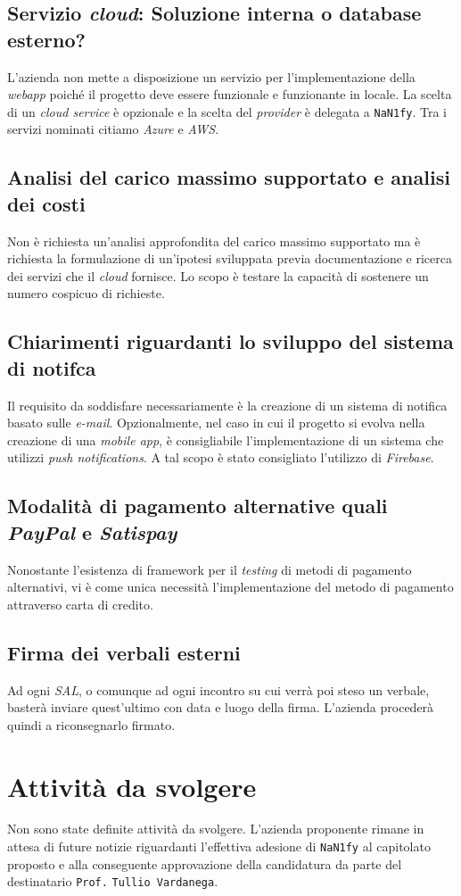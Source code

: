 \subsection{Servizio \textit{cloud}: Soluzione interna o database esterno?}
    L'azienda non mette a disposizione un servizio per l'implementazione della \textit{webapp} poiché il progetto deve essere funzionale e funzionante in locale. La scelta di un \textit{cloud service} è opzionale e la scelta del \textit{provider} è delegata a \texttt{NaN1fy}. Tra i servizi nominati citiamo \textit{Azure} e \textit{AWS}.
\subsection{Analisi del carico massimo supportato e analisi dei costi}
    Non è richiesta un'analisi approfondita del carico massimo supportato ma è richiesta la formulazione di un'ipotesi sviluppata previa documentazione e ricerca dei servizi che il \textit{cloud} fornisce.
    Lo scopo è testare la capacità di sostenere un numero cospicuo di richieste.
\subsection{Chiarimenti riguardanti lo sviluppo del sistema di notifca}
    Il requisito da soddisfare necessariamente è la creazione di un sistema di notifica basato sulle \textit{e-mail}. Opzionalmente, nel caso in cui il progetto si evolva nella creazione di una \textit{mobile app}, è consigliabile l'implementazione di un sistema che utilizzi \textit{push notifications}. A tal scopo è stato consigliato l'utilizzo di \textit{Firebase}.
\subsection{Modalità di pagamento alternative quali \textit{PayPal} e \textit{Satispay}}
    Nonostante l'esistenza di framework per il \textit{testing} di metodi di pagamento alternativi, vi è come unica necessità l'implementazione del metodo di pagamento attraverso carta di credito.
\subsection{Firma dei verbali esterni}
Ad ogni \textit{SAL}, o comunque ad ogni incontro su cui verrà poi steso un verbale, basterà inviare quest'ultimo con data e luogo della firma. L'azienda procederà quindi a riconsegnarlo firmato.
\section{Attività da svolgere}
Non sono state definite attività da svolgere. L'azienda proponente rimane in attesa di future notizie riguardanti l'effettiva adesione di \texttt{NaN1fy} al capitolato proposto e alla conseguente approvazione della candidatura da parte del destinatario \texttt{Prof.} \texttt{Tullio Vardanega}.
\\\\

